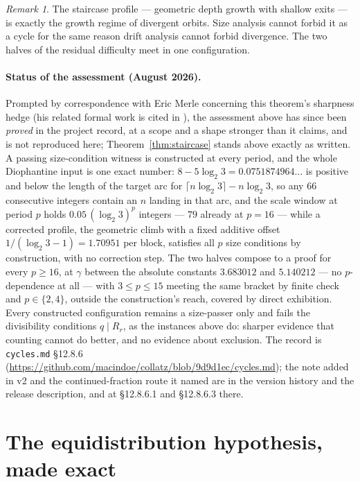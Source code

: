 \documentclass[11pt]{article}
\theoremstyle{remark}
\newtheorem{remark}[theorem]{Remark}
\newcommand{\LL}{\log_2 3}
\begin{document}
\begin{remark}\label{rem:staircase}
The staircase profile --- geometric depth growth with shallow exits --- is exactly the growth regime of divergent orbits. Size analysis cannot forbid it as a cycle for the same reason drift analysis cannot forbid divergence. The two halves of the residual difficulty meet in one configuration.
\end{remark}

\paragraph{Status of the assessment (August 2026).} Prompted by correspondence with Eric Merle concerning this theorem's sharpness hedge (his related formal work is cited in \cite{merle}), the assessment above has since been \emph{proved} in the project record, at a scope and a shape stronger than it claims, and is not reproduced here; Theorem~\ref{thm:staircase} stands above exactly as written. A passing size-condition witness is constructed at every period, and the whole Diophantine input is one exact number: $8 - 5\LL = 0.0751874964\ldots$ is positive and below the length of the target arc for $\lceil n\LL\rceil - n\LL$, so any $66$ consecutive integers contain an $n$ landing in that arc, and the scale window at period $p$ holds $0.05\,(\LL)^{p}$ integers --- $79$ already at $p = 16$ --- while a corrected profile, the geometric climb with a fixed additive offset $1/(\LL - 1) = 1.70951$ per block, satisfies all $p$ size conditions by construction, with no correction step. The two halves compose to a proof for every $p \ge 16$, at $\gamma$ between the absolute constants $3.683012$ and $5.140212$ --- no $p$-dependence at all --- with $3 \le p \le 15$ meeting the same bracket by finite check and $p \in \{2,4\}$, outside the construction's reach, covered by direct exhibition. Every constructed configuration remains a size-passer only and fails the divisibility conditions $q \mid R_r$, as the instances above do: sharper evidence that counting cannot do better, and no evidence about exclusion. The record is \texttt{cycles.md} \S12.8.6 (\url{https://github.com/macindoe/collatz/blob/9d9d1ec/cycles.md}); the note added in v2 and the continued-fraction route it named are in the version history and the release description, and at \S12.8.6.1 and \S12.8.6.3 there.

\section{The equidistribution hypothesis, made exact}\label{sec:aeh}
\end{document}
